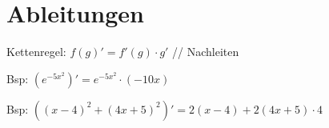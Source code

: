 
\usepackage{amsfonts}
\usepackage{pdfpages}


\newcommand{\Naeherung}{\textcolor{purple}{\textbf{Näherung}}}
\newcommand{\gray}[1]{\textcolor{lgr}{#1}}



\section*{Ableitungen}
Kettenregel: $f(g)' = f'(g) \cdot g'$ // Nachleiten 

Bsp: $(e^{-5x^2})' = e^{-5x^2} \cdot (-10x)$

Bsp: $((x-4)^2 +(4x+5)^2)' = 2(x-4) + 2(4x+5)\cdot4 $




